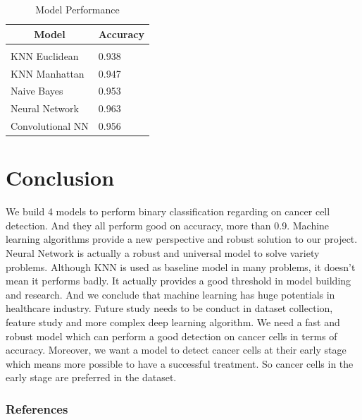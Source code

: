 \documentclass{article} %
\begin{document}
\begin{table}[H]
\caption{Model Performance}
\begin{center}
\begin{tabular}{ll}
\multicolumn{1}{c}{\bf Model}  &\multicolumn{1}{c}{\bf Accuracy}
\\ \hline \\
KNN Euclidean    & 0.938 \\
KNN Manhattan  & 0.947\\
Naive Bayes   & 0.953\\
Neural Network  & 0.963\\
Convolutional NN  & 0.956\\
\end{tabular}
\end{center}
\end{table}



\section{Conclusion}
We build 4 models to perform binary classification regarding on cancer cell detection. And they all perform good on accuracy, more than 0.9. Machine learning algorithms provide a new perspective and robust solution to our project. Neural Network is actually a robust and universal model to solve variety problems. Although KNN is used as baseline model in many problems, it doesn't mean it performs badly. It actually provides a good threshold in model building and research. And we conclude that machine learning has huge potentials in healthcare industry. Future study needs to be conduct in dataset collection, feature study and more complex deep learning algorithm. We need a fast and robust model which can perform a good detection on cancer cells in terms of accuracy. Moreover, we want a model to detect cancer cells at their early stage which means more possible to have a successful treatment. So cancer cells in the early stage are preferred in the dataset. 
\subsubsection*{References}
\end{document}
